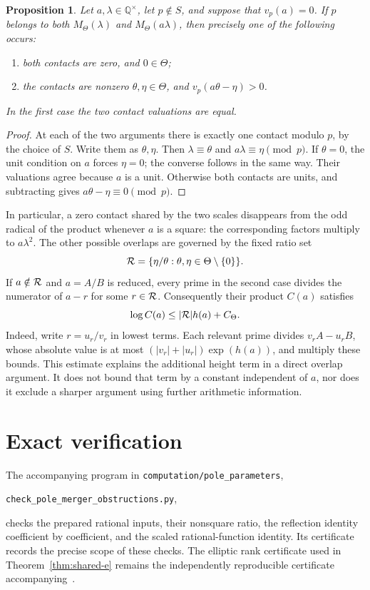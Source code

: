 \documentclass[11pt,a4paper]{article}
\newtheorem{proposition}[theorem]{Proposition}
\newcommand{\Q}{\mathbb Q}
\begin{document}
\begin{proposition}\label{prop:collisions}
Let $a,\lambda\in\Q^\times$, let $p\notin S$, and suppose that
$v_p(a)=0$. If $p$ belongs to both $M_\Theta(\lambda)$ and
$M_\Theta(a\lambda)$, then precisely one of the following occurs:
\begin{enumerate}
\item both contacts are zero, and $0\in\Theta$;
\item the contacts are nonzero $\theta,\eta\in\Theta$, and
      $v_p(a\theta-\eta)>0$.
\end{enumerate}
In the first case the two contact valuations are equal.
\end{proposition}
\begin{proof}
At each of the two arguments there is exactly one contact modulo
$p$, by the choice of $S$. Write them as $\theta,\eta$.
Then $\lambda\equiv\theta$ and $a\lambda\equiv\eta\pmod p$.
If $\theta=0$, the unit condition on $a$ forces $\eta=0$;
the converse follows in the same way. Their valuations agree
because $a$ is a unit. Otherwise both contacts are units, and
subtracting gives $a\theta-\eta\equiv0\pmod p$.
\end{proof}

In particular, a zero contact shared by the two scales disappears
from the odd radical of the product whenever $a$ is a square:
the corresponding factors multiply to $a\lambda^2$.
The other possible overlaps are governed by the fixed ratio set
\[
 {\cal R}=\{\eta/\theta:\theta,\eta\in\Theta\setminus\{0\}\}.
\]
If $a\notin{\cal R}$ and $a=A/B$ is reduced, every prime in
the second case divides the numerator of $a-r$ for some
$r\in{\cal R}$. Consequently their product $C(a)$ satisfies
\[
                  \log C(a)\le |{\cal R}|h(a)+C_\Theta.
\]
Indeed, write $r=u_r/v_r$ in lowest terms. Each relevant prime
divides $v_rA-u_rB$, whose absolute value is at most
$(|v_r|+|u_r|)\exp(h(a))$, and multiply these bounds.
This estimate explains the additional height term in a direct
overlap argument. It does not bound that term by a constant
independent of $a$, nor does it exclude a sharper argument
using further arithmetic information.

\section*{Exact verification}

The accompanying program in \nolinkurl{computation/pole_parameters},
\begin{center}\small
\nolinkurl{check_pole_merger_obstructions.py},
\end{center}
checks the prepared rational inputs, their nonsquare ratio,
the reflection identity coefficient by coefficient, and the
scaled rational-function identity. Its certificate records the
precise scope of these checks. The elliptic rank certificate
used in Theorem~\ref{thm:shared-e} remains the independently
reproducible certificate accompanying~\cite{Fixed}.
\end{document}
